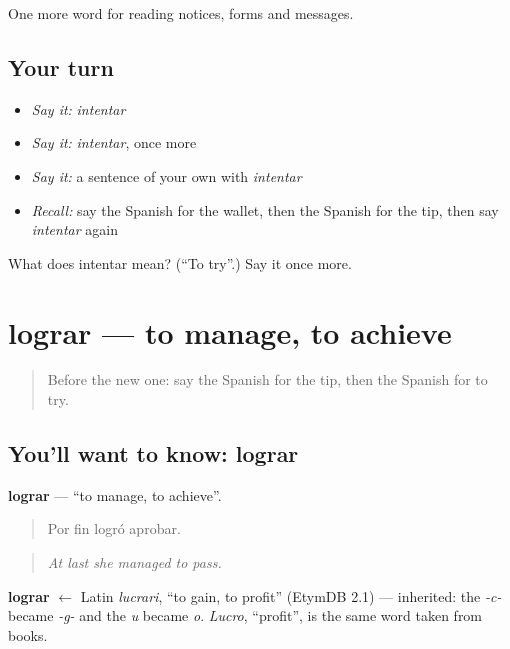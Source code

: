 \begin{grammarlens}[title={What you've built}]
One more word for reading notices, forms and messages.
\end{grammarlens}

\subsection*{Your turn}
\begin{itemize}
\raggedright
  \item \emph{Say it:} \emph{intentar}
  \item \emph{Say it:} \emph{intentar}, once more
  \item \emph{Say it:} a sentence of your own with \emph{intentar}
  \item \emph{Recall:} say the Spanish for the wallet, then the Spanish for the tip, then say \emph{intentar} again
\end{itemize}

\begin{tcolorbox}[breakable,colback=teal!4,colframe=teal!35!black,title={Before you move on}]
What does intentar mean? (\textquotedblleft{}To try\textquotedblright{}.) Say it once more.
\end{tcolorbox}
\section[lograr]{lograr — to manage, to achieve}

\label{lesson:ES-C492-lograr}



\begin{quote}
Before the new one: say the Spanish for the tip, then the Spanish for to try.
\end{quote}

\subsection*{You'll want to know: lograr}
\textbf{lograr} — \textquotedblleft{}to manage, to achieve\textquotedblright{}.

\begin{quote}
Por fin logró aprobar.
\end{quote}

\begin{quote}
\emph{At last she managed to pass.}
\end{quote}

\begin{cousinweb}
\textbf{lograr} $\leftarrow$ Latin \emph{lucrari}, \textquotedblleft{}to gain, to profit\textquotedblright{} (EtymDB 2.1) — inherited: the \emph{-c-} became \emph{-g-} and the \emph{u} became \emph{o}. \emph{Lucro}, \textquotedblleft{}profit\textquotedblright{}, is the same word taken from books.
\end{cousinweb}

